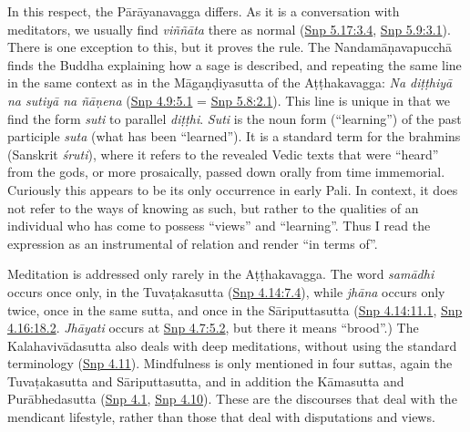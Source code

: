 \documentclass[12pt,openany]{book}%
\begin{document}
In this respect, the \textsanskrit{Pārāyanavagga} differs. As it is a conversation with meditators, we usually find \textit{\textsanskrit{viññāta}} there as normal (\href{https://suttacentral.net/snp5.17/en/sujato\#3.4}{Snp 5.17:3.4}, \href{https://suttacentral.net/snp5.9/en/sujato\#3.1}{Snp 5.9:3.1}). There is one exception to this, but it proves the rule. The \textsanskrit{Nandamāṇavapucchā} finds the Buddha explaining how a sage is described, and repeating the same line in the same context as in the \textsanskrit{Māgaṇḍiyasutta} of the \textsanskrit{Aṭṭhakavagga}: \textit{Na \textsanskrit{diṭṭhiyā} na \textsanskrit{sutiyā} na \textsanskrit{ñāṇena}} (\href{https://suttacentral.net/snp4.9/en/sujato\#5.1}{Snp 4.9:5.1} = \href{https://suttacentral.net/snp5.8/en/sujato\#2.1}{Snp 5.8:2.1}). This line is unique in that we find the form \textit{suti} to parallel \textit{\textsanskrit{diṭṭhi}}. \textit{Suti} is the noun form (“learning”) of the past participle \textit{suta} (what has been “learned”). It is a standard term for the brahmins (Sanskrit \textit{\textsanskrit{śruti}}), where it refers to the revealed Vedic texts that were “heard” from the gods, or more prosaically, passed down orally from time immemorial. Curiously this appears to be its only occurrence in early Pali. In context, it does not refer to the ways of knowing as such, but rather to the qualities of an individual who has come to possess “views” and “learning”. Thus I read the expression as an instrumental of relation and render “in terms of”.

Meditation is addressed only rarely in the \textsanskrit{Aṭṭhakavagga}. The word \textit{\textsanskrit{samādhi}} occurs once only, in the \textsanskrit{Tuvaṭakasutta} (\href{https://suttacentral.net/snp4.14/en/sujato\#7.4}{Snp 4.14:7.4}), while \textit{\textsanskrit{jhāna}} occurs only twice, once in the same sutta, and once in the \textsanskrit{Sāriputtasutta} (\href{https://suttacentral.net/snp4.14/en/sujato\#11.1}{Snp 4.14:11.1}, \href{https://suttacentral.net/snp4.16/en/sujato\#18.2}{Snp 4.16:18.2}. \textit{\textsanskrit{Jhāyati}} occurs at \href{https://suttacentral.net/snp4.7/en/sujato\#5.2}{Snp 4.7:5.2}, but there it means “brood”.) The \textsanskrit{Kalahavivādasutta} also deals with deep meditations, without using the standard terminology (\href{https://suttacentral.net/snp4.11/en/sujato}{Snp 4.11}). Mindfulness is only mentioned in four suttas, again the \textsanskrit{Tuvaṭakasutta} and \textsanskrit{Sāriputtasutta}, and in addition the \textsanskrit{Kāmasutta} and \textsanskrit{Purābhedasutta} (\href{https://suttacentral.net/snp4.1/en/sujato}{Snp 4.1}, \href{https://suttacentral.net/snp4.10/en/sujato}{Snp 4.10}). These are the discourses that deal with the mendicant lifestyle, rather than those that deal with disputations and views.
\end{document}
